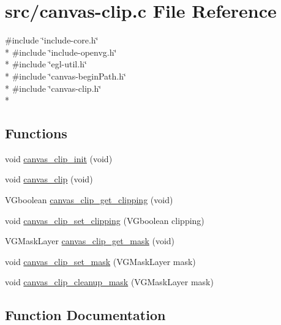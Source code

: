 \hypertarget{canvas-clip_8c}{}\section{src/canvas-\/clip.c File Reference}
\label{canvas-clip_8c}
{\ttfamily \#include \char`\"{}include-\/core.\+h\char`\"{}}\\*
{\ttfamily \#include \char`\"{}include-\/openvg.\+h\char`\"{}}\\*
{\ttfamily \#include \char`\"{}egl-\/util.\+h\char`\"{}}\\*
{\ttfamily \#include \char`\"{}canvas-\/begin\+Path.\+h\char`\"{}}\\*
{\ttfamily \#include \char`\"{}canvas-\/clip.\+h\char`\"{}}\\*
\subsection*{Functions}
\begin{DoxyCompactItemize}
\item 
void \hyperlink{canvas-clip_8c_a2d531b09936a3622973c6902f251a8b7}{canvas\+\_\+clip\+\_\+init} (void)
\item 
void \hyperlink{canvas-clip_8c_ade0def031a2b4c1dcb342cb19c1ed695}{canvas\+\_\+clip} (void)
\item 
V\+Gboolean \hyperlink{canvas-clip_8c_a39b862c177870905789aefcf1cffb4ef}{canvas\+\_\+clip\+\_\+get\+\_\+clipping} (void)
\item 
void \hyperlink{canvas-clip_8c_a94e4d7a7f36f3a933531898b5a1779c6}{canvas\+\_\+clip\+\_\+set\+\_\+clipping} (V\+Gboolean clipping)
\item 
V\+G\+Mask\+Layer \hyperlink{canvas-clip_8c_ade2b0675d3365ea8b81c8b31eed3f907}{canvas\+\_\+clip\+\_\+get\+\_\+mask} (void)
\item 
void \hyperlink{canvas-clip_8c_af889b304af28cd66095499ee7a2a2635}{canvas\+\_\+clip\+\_\+set\+\_\+mask} (V\+G\+Mask\+Layer mask)
\item 
void \hyperlink{canvas-clip_8c_a39e21e3c386f34eb80c2ea8dd437af23}{canvas\+\_\+clip\+\_\+cleanup\+\_\+mask} (V\+G\+Mask\+Layer mask)
\end{DoxyCompactItemize}


\subsection{Function Documentation}
\hypertarget{canvas-clip_8c_ade0def031a2b4c1dcb342cb19c1ed695}{}
